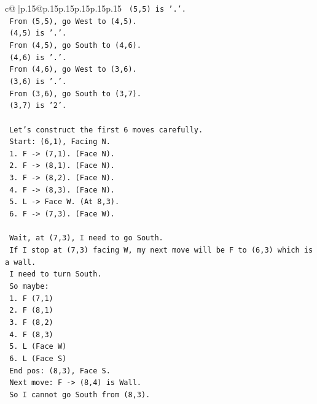 \documentclass{article}
\begin{document}
{\begin{supertabular}{c@{$\;$}|p{.15\linewidth}@{}p{.15\linewidth}p{.15\linewidth}p{.15\linewidth}p{.15\linewidth}p{.15\linewidth}}
{{{\texttt{       (5,5) is '.'.} \\
\texttt{       From (5,5), go West to (4,5).} \\
\texttt{       (4,5) is '.'.} \\
\texttt{       From (4,5), go South to (4,6).} \\
\texttt{       (4,6) is '.'.} \\
\texttt{       From (4,6), go West to (3,6).} \\
\texttt{       (3,6) is '.'.} \\
\texttt{       From (3,6), go South to (3,7).} \\
\texttt{       (3,7) is '2'.} \\
\\ 
\texttt{       Let's construct the first 6 moves carefully.} \\
\texttt{       Start: (6,1), Facing N.} \\
\texttt{       1. F {-}> (7,1). (Face N).} \\
\texttt{       2. F {-}> (8,1). (Face N).} \\
\texttt{       3. F {-}> (8,2). (Face N).} \\
\texttt{       4. F {-}> (8,3). (Face N).} \\
\texttt{       5. L {-}> Face W. (At 8,3).} \\
\texttt{       6. F {-}> (7,3). (Face W).} \\
\\ 
\texttt{       Wait, at (7,3), I need to go South.} \\
\texttt{       If I stop at (7,3) facing W, my next move will be F to (6,3) which is a wall.} \\
\texttt{       I need to turn South.} \\
\texttt{       So maybe:} \\
\texttt{       1. F (7,1)} \\
\texttt{       2. F (8,1)} \\
\texttt{       3. F (8,2)} \\
\texttt{       4. F (8,3)} \\
\texttt{       5. L (Face W)} \\
\texttt{       6. L (Face S)} \\
\texttt{       End pos: (8,3), Face S.} \\
\texttt{       Next move: F {-}> (8,4) is Wall.} \\
\texttt{       So I cannot go South from (8,3).} \\
\\ 
}}}
\end{supertabular}}
\end{document}
